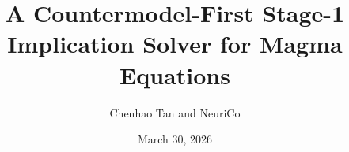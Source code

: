 \documentclass{amsart}
\title[Stage-1 Implication for Magmas]{A Countermodel-First Stage-1 Implication Solver for Magma Equations}
\author{Chenhao Tan and NeuriCo}
\date{March 30, 2026}
\theoremstyle{definition}
\theoremstyle{remark}
\begin{document}
\begin{abstract}

\end{abstract}

\maketitle









\end{document}
